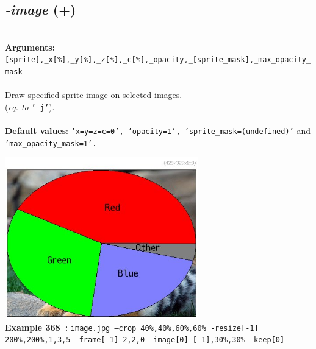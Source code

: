 \documentclass[a4paper,11pt,twoside]{book}
\begin{document}
\subsection{\emph{-image} (+)}\vspace*{-0.5em}
~\\\textbf{Arguments: } 
{\small \texttt{[sprite],\_x[\%],\_y[\%],\_z[\%],\_c[\%],\_opacity,\_[sprite\_mask],\_max\_opacity\_mask}}\\~\\
Draw specified sprite image on selected images.
~\\(\emph{eq. to} {\small \texttt{'-j'}}).
~\\~\\\textbf{Default values}: {\small \texttt{'x=y=z=c=0', 'opacity=1', 'sprite\_mask=(undefined)'} and \texttt{'max\_opacity\_mask=1'.}}
\begin{center}\includegraphics[keepaspectratio=true,height=7cm,width=\textwidth]{img/gmic_def368.jpg}\\
{\footnotesize \textbf{Example 368~:} \texttt{image.jpg --crop 40\%,40\%,60\%,60\% -resize[-1] 200\%,200\%,1,3,5 -frame[-1] 2,2,0 -image[0] [-1],30\%,30\% -keep[0]}}
\end{center}
\end{document}
